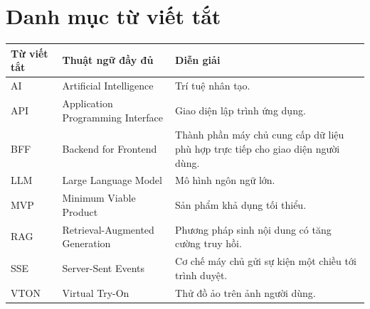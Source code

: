 \chapter*{Danh mục từ viết tắt}
{}

\begin{table}[H]
\centering
\begin{tabularx}{\textwidth}{L{2.2cm}L{5.2cm}Y}
\toprule
\textbf{Từ viết tắt} & \textbf{Thuật ngữ đầy đủ} & \textbf{Diễn giải} \\
\midrule
AI & Artificial Intelligence & Trí tuệ nhân tạo. \\
\addlinespace
API & Application Programming Interface & Giao diện lập trình ứng dụng. \\
\addlinespace
BFF & Backend for Frontend & Thành phần máy chủ cung cấp dữ liệu phù hợp trực tiếp cho giao diện người dùng. \\
\addlinespace
LLM & Large Language Model & Mô hình ngôn ngữ lớn. \\
\addlinespace
MVP & Minimum Viable Product & Sản phẩm khả dụng tối thiểu. \\
\addlinespace
RAG & Retrieval-Augmented Generation & Phương pháp sinh nội dung có tăng cường truy hồi. \\
\addlinespace
SSE & Server-Sent Events & Cơ chế máy chủ gửi sự kiện một chiều tới trình duyệt. \\
\addlinespace
VTON & Virtual Try-On & Thử đồ ảo trên ảnh người dùng. \\
\bottomrule
\end{tabularx}
\end{table}

\clearpage
